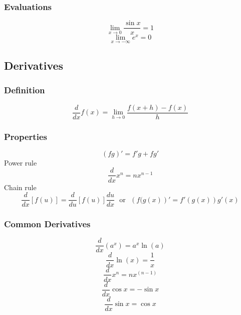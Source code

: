 \documentclass{article}
\begin{document}
		\subsubsection{Evaluations}
			\begin{equation}
				\mathop {\lim }\limits_{x \to 0} \frac{{\sin x}}{x} = 1
			\end{equation}
			\begin{equation}
				\mathop {\lim }\limits_{x \to - \infty } e^x = 0
			\end{equation}
	\subsection{Derivatives}
		\subsubsection{Definition}
			\begin{equation}
				\frac{d}{{dx}}f\left( x \right) = \mathop {\lim }\limits_{h \to 0} \frac{{f\left( {x + h } \right) - f\left( x \right)}}{h }
			\end{equation}
		\subsubsection{Properties}
			\begin{equation}
				\left(fg\right)'=f'g+fg'
			\end{equation}
			Power rule
			\begin{equation}
				\frac{d}{dx}x^n = nx^{n-1}
			\end{equation}
			Chain rule
			\begin{equation}
				\frac{d}{{dx}}\left[ {f\left( u \right)} \right] = \frac{d}{{du}}\left[ {f\left( u \right)} \right]\frac{{du}}{{dx}} \ \ \ \mbox{or} \ \ \ \left(f(g(x)\right)'=f'\left(g(x)\right)g'(x)
			\end{equation}
		\subsubsection{Common Derivatives}
			\begin{equation}
				\frac{d}{{dx}}\left(a^x\right)=a^x\ln(a)
			\end{equation}
			\begin{equation}
				\frac{d}{{dx}}\ln \left( x \right) = \frac{1}{x}
			\end{equation}
			\begin{equation}
				\frac{d}{{dx}}x^n = nx^{\left( {n - 1} \right)}
			\end{equation}
			\begin{equation}
				\frac{d}{{dx}}\cos x = -\sin x
			\end{equation}
			\begin{equation}
				\frac{d}{{dx}}\sin x = \cos x
			\end{equation}
\end{document}
